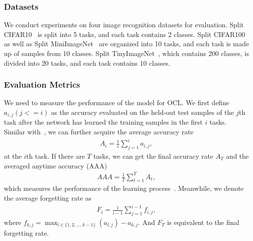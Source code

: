 \subsubsection{Datasets}
We conduct experiments on four image recognition datasets for evaluation. Split CIFAR10~\cite{krizhevsky2009learning} is split into 5 tasks, and each task contains 2 classes. Split CIFAR100~\cite{krizhevsky2009learning} as well as Split MiniImageNet~\cite{vinyals2016matching} are organized into 10 tasks, and each task is made up of samples from 10 classes. Split TinyImageNet~\cite{le2015tiny}, which contains 200 classes, is divided into 20 tasks, and each task contains 10 classes. 



\subsubsection{Evaluation Metrics}
We need to measure the performance of the model for OCL. We first define $a_{i,j}(j<=i)$ as the accuracy evaluated on the held-out test samples of the $j$th task after the network has learned the training samples in the first $i$ tasks. Similar with~\cite{shim2021online}, we can further acquire the average accuracy rate
\begin{equation}
\label{eq:first}
 	\begin{split}
	 	A_i = \frac{1}{i}\sum_{j=1}^{i}a_{i,j},
 	\end{split}
\end{equation}
at the $i$th task. If there are $T$ tasks, we can get the final accuracy rate $A_T$ and the averaged anytime accuracy (AAA)
\begin{equation}
\label{eq:second}
 	\begin{split}
	 	AAA = \frac{1}{T}\sum_{t=1}^{T}A_{t},
 	\end{split}
\end{equation}
which measures the performance of the learning process~\cite{caccia2021new}.
Meanwhile, we denote the average forgetting rate as
\begin{equation}
\label{eq:first}
 	\begin{split}
F_i = \frac{1}{i-1}\sum_{j=1}^{i-1}f_{i,j},
 	\end{split}
\end{equation}
where $f_{k,j}= \mathop{\max}_{l\in\{1,2,...,k-1\}}(a_{l,j})-a_{k,j}$. And $F_T$ is equivalent to the final forgetting rate.

